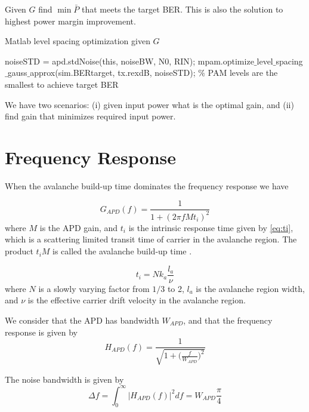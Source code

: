 \documentclass[a4paper]{article}
\begin{document}
Given $G$ find $\min\bar{P}$ that meets the target BER. This is also the solution to highest power margin improvement.

\begin{algorithm}
\caption{Matlab level spacing optimization given $G$}
\label{level-space-opt-given-G}
\begin{algorithmic}[1]
\State noiseSTD = apd.stdNoise(this, noiseBW, N0, RIN);
\State mpam.optimize$\_$level$\_$spacing$\_$gauss$\_$approx(sim.BERtarget, tx.rexdB, noiseSTD); $\%$ PAM levels are the smallest to achieve target BER
\end{algorithmic}
\end{algorithm}

We have two scenarios: (i) given input power what is the optimal gain, and (ii) find gain that minimizes required input power.




\section{Frequency Response}

When the avalanche build-up time dominates the frequency response we have \cite{}

\begin{equation}
G_{APD}(f) = \frac{1}{1 + (2\pi fMt_i)^2}
\end{equation}
where $M$ is the APD gain, and $t_i$ is the intrinsic response time given by \eqref{eq:ti}, which is a scattering limited transit time of carrier in the avalanche region. The product $t_iM$ is called the avalanche build-up time \cite{frequency-reponse-InP-InGaAs}.

\begin{equation}
t_i = Nk_a\frac{l_a}{\nu}
\end{equation}
where $N$ is a slowly varying factor from $1/3$ to 2, $l_a$ is the avalanche region width, and $\nu$ is the effective carrier drift velocity in the avalanche region.

We consider that the APD has bandwidth $W_{APD}$, and that the frequency response is given by
\begin{equation}
H_{APD}(f) = \frac{1}{\sqrt{1 + \bigg(\frac{f}{W_{APD}}\bigg)^2}}
\end{equation}

The noise bandwidth is given by
\begin{equation}
\Delta f = \int_{0}^{\infty} |H_{APD}(f)|^2 df = W_{APD}\frac{\pi}{4}
\end{equation}
\end{document}
